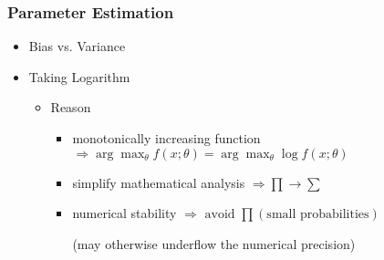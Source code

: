 \subsubsection{Parameter Estimation}
\begin{itemize}
\item Bias vs. Variance


\item Taking Logarithm
	\begin{itemize}
	\item Reason
		\begin{itemize}
		\item monotonically increasing function $\Rightarrow \arg\max_{\theta}f(x;\theta) = \arg\max_\theta\log f(x;\theta)$
		\item simplify mathematical analysis $\Rightarrow \prod \rightarrow \sum$
		\item numerical stability $\Rightarrow \text{ avoid } \prod (\text{small probabilities})$
		
		(may otherwise underflow the numerical precision)
		\end{itemize}
	\end{itemize}


\end{itemize}
